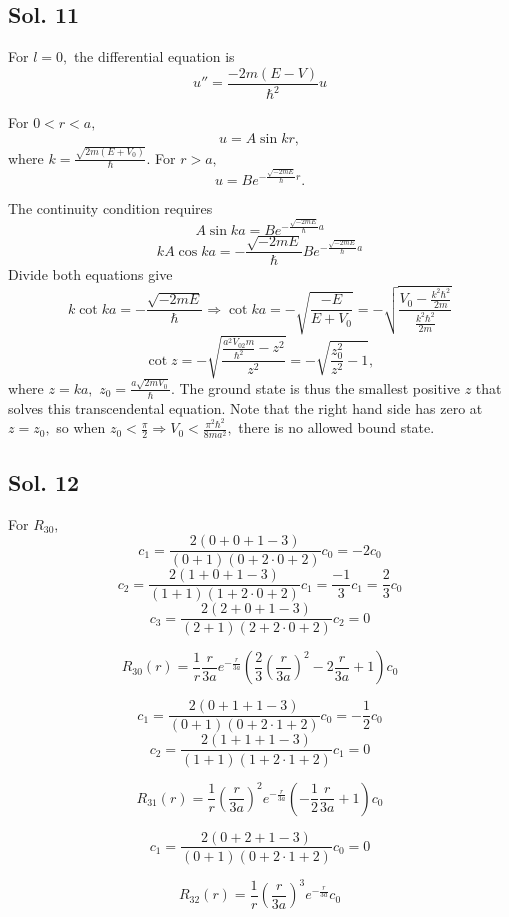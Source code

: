 \subsection*{Sol. 11}
For $l=0,$ the differential equation is
$$
u'' = \frac{-2m(E-V)}{\hbar^2}u
$$

For $0<r<a,$
$$
u= A\sin k r,
$$
where $k=\frac{\sqrt{2m(E+V_0)}}{\hbar}.$
For $r>a,$
$$
u=Be^{-\frac{\sqrt{-2mE}}{\hbar}r}.
$$

The continuity condition requires 
$$
A\sin ka = Be^{-\frac{\sqrt{-2mE}}{\hbar}a}
$$
$$
kA\cos ka = -\frac{\sqrt{-2mE}}{\hbar}Be^{-\frac{\sqrt{-2mE}}{\hbar}a}
$$
Divide both equations give
$$
k\cot ka = -\frac{\sqrt{-2mE}}{\hbar}
\Rightarrow
\cot ka = -\sqrt{\frac{-E}{E+V_0}} 
=-\sqrt{\frac{V_0-\frac{k^2\hbar^2}{2m}}{\frac{k^2\hbar^2}{2m}}}
$$
$$
\cot z = -\sqrt{\frac{\frac{a^2V_02m}{\hbar^2}-z^2}{z^2}}
=-\sqrt{\frac{z_0^2}{z^2}-1},
$$
where $z = ka,$ $z_0 = \frac{a\sqrt{2mV_0}}{\hbar}.$ The ground state is thus the smallest positive $z$ that solves this transcendental equation.
 Note that the right hand side has zero at 
 $
 z=z_0,
 $
 so when $z_0<\frac{\pi}{2}\Rightarrow V_0<\frac{\pi^2\hbar^2}{8ma^2},$ there is no allowed bound state.

 \subsection*{Sol. 12}
 For $R_{30},$
 $$
 c_1 = \frac{2(0+0+1-3)}{(0+1)(0+2\cdot 0+2)}c_0
 =-2c_0
 $$
 $$
 c_2 = \frac{2(1+0+1-3)}{(1+1)(1+2\cdot 0+2)}c_1
 =\frac{-1}{3}c_1
 =\frac{2}{3}c_0
 $$
 $$
 c_3 = \frac{2(2+0+1-3)}{(2+1)(2+2\cdot 0+2)}c_2
 =0
 $$

 $$
 R_{30}(r)=
 \frac{1}{r}
 \frac{r}{3a} 
 e^{-\frac{r}{3a}}
 \left(\frac{2}{3}\left(\frac{r}{3a}\right)^2-2\frac{r}{3a}+1\right)c_0
 $$

 $$
 c_1 = \frac{2(0+1+1-3)}{(0+1)(0+2\cdot 1+2)}c_0
 =-\frac{1}{2}c_0
 $$
 $$
 c_2 = \frac{2(1+1+1-3)}{(1+1)(1+2\cdot 1+2)}c_1
 =0
 $$


 $$
 R_{31}(r)=
 \frac{1}{r}
 \left(\frac{r}{3a}\right)^2 
 e^{-\frac{r}{3a}}
 \left(-\frac{1}{2}\frac{r}{3a}+1\right)c_0
 $$

 $$
 c_1 = \frac{2(0+2+1-3)}{(0+1)(0+2\cdot 1+2)}c_0
 =0
 $$



 $$
 R_{32}(r)=
 \frac{1}{r}
 \left(\frac{r}{3a}\right)^3 
 e^{-\frac{r}{3a}}
 c_0
 $$

